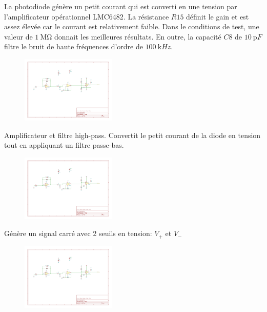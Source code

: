 \documentclass[french]{layout/Report}
\begin{document}
\begin{description}[leftmargin=!,labelwidth=3cm, labelindent=\parindent]
	\item[Conversion] La photodiode génère un petit courant qui est converti en une tension par l'amplificateur opérationnel LMC6482. La résistance $\mathit{R15}$ définit le gain et est assez élevée car le courant est relativement faible. Dans le conditions de test, une valeur de $\SI{1}{\mega\ohm}$ donnait les meilleures résultats. En outre, la capacité $\mathit{C8}$ de $\SI{10}{\pico F}$ filtre le bruit de haute fréquences d'ordre de $\SI{100}{\kilo Hz}$.
		\begin{figure}[h]
			\centering
			\includegraphics[width=0.4\textwidth]{fig/current_to_voltage_converter.pdf}
		\end{figure}

	\item[Amplification] Amplificateur et filtre high-pass. Convertit le petit courant de la diode en tension tout en appliquant un filtre passe-bas.
		\begin{figure}[h]
			\centering
			\includegraphics[width=0.4\textwidth]{fig/amplifier.pdf}
		\end{figure}

	\item[Schmitt trigger] Génère un signal carré avec 2 seuils en tension: $V_+$ et $V_-$
		\begin{figure}[h]
			\centering
			\includegraphics[width=0.4\textwidth]{fig/schmitt_trigger.pdf}
		\end{figure}
\end{description}
\end{document}
